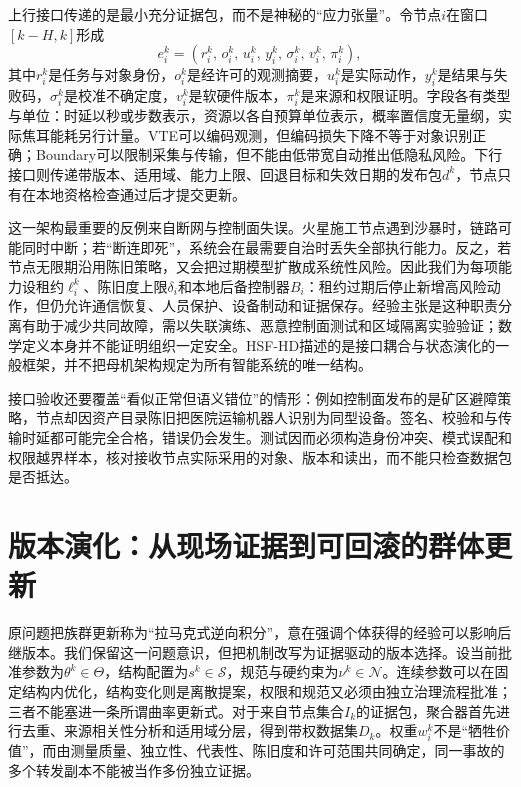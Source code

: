 上行接口传递的是最小充分证据包，而不是神秘的“应力张量”。令节点$i$在窗口$[k-H,k]$形成
\begin{equation}
e_i^k=(r_i^k,\,o_i^k,\,u_i^k,\,y_i^k,\,\sigma_i^k,\,v_i^k,\,\pi_i^k),
\end{equation}
其中$r_i^k$是任务与对象身份，$o_i^k$是经许可的观测摘要，$u_i^k$是实际动作，$y_i^k$是结果与失败码，$\sigma_i^k$是校准不确定度，$v_i^k$是软硬件版本，$\pi_i^k$是来源和权限证明。字段各有类型与单位：时延以秒或步数表示，资源以各自预算单位表示，概率置信度无量纲，实际焦耳能耗另行计量。VTE可以编码观测，但编码损失下降不等于对象识别正确；Boundary可以限制采集与传输，但不能由低带宽自动推出低隐私风险。下行接口则传递带版本、适用域、能力上限、回退目标和失效日期的发布包$d^k$，节点只有在本地资格检查通过后才提交更新。

这一架构最重要的反例来自断网与控制面失误。火星施工节点遇到沙暴时，链路可能同时中断；若“断连即死”，系统会在最需要自治时丢失全部执行能力。反之，若节点无限期沿用陈旧策略，又会把过期模型扩散成系统性风险。因此我们为每项能力设租约$\ell_i^k$、陈旧度上限$\delta_i$和本地后备控制器$B_i$：租约过期后停止新增高风险动作，但仍允许通信恢复、人员保护、设备制动和证据保存。经验主张是这种职责分离有助于减少共同故障，需以失联演练、恶意控制面测试和区域隔离实验验证；数学定义本身并不能证明组织一定安全。HSF-HD描述的是接口耦合与状态演化的一般框架，并不把母机架构规定为所有智能系统的唯一结构。

接口验收还要覆盖“看似正常但语义错位”的情形：例如控制面发布的是矿区避障策略，节点却因资产目录陈旧把医院运输机器人识别为同型设备。签名、校验和与传输时延都可能完全合格，错误仍会发生。测试因而必须构造身份冲突、模式误配和权限越界样本，核对接收节点实际采用的对象、版本和读出，而不能只检查数据包是否抵达。

\section{版本演化：从现场证据到可回滚的群体更新}
\label{sec:lamarckian_evolution}

原问题把族群更新称为“拉马克式逆向积分”，意在强调个体获得的经验可以影响后继版本。我们保留这一问题意识，但把机制改写为证据驱动的版本选择。设当前批准参数为$\theta^k\in\Theta$，结构配置为$s^k\in\mathcal{S}$，规范与硬约束为$\nu^k\in\mathcal{N}$。连续参数可以在固定结构内优化，结构变化则是离散提案，权限和规范又必须由独立治理流程批准；三者不能塞进一条所谓曲率更新式。对于来自节点集合$I_k$的证据包，聚合器首先进行去重、来源相关性分析和适用域分层，得到带权数据集$D_k$。权重$w_i^k$不是“牺牲价值”，而由测量质量、独立性、代表性、陈旧度和许可范围共同确定，同一事故的多个转发副本不能被当作多份独立证据。

